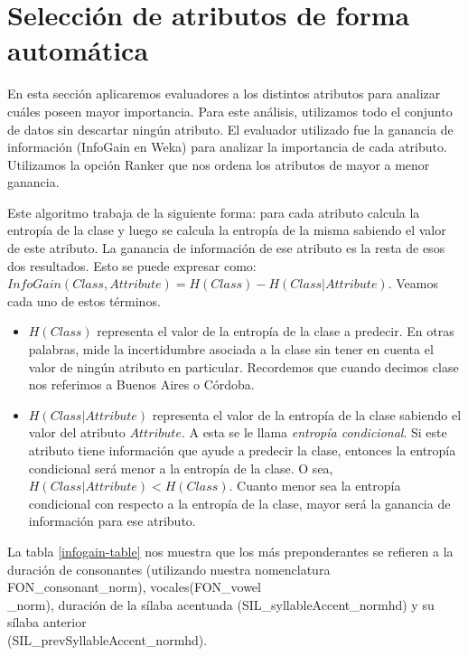 
\section{Selección de atributos de forma automática}



En esta sección aplicaremos evaluadores a los distintos atributos para analizar cuáles poseen mayor importancia. Para este análisis, utilizamos todo el conjunto de datos sin descartar ningún atributo. El evaluador utilizado fue la ganancia de información (InfoGain en Weka) para analizar la importancia de cada atributo. Utilizamos la opción Ranker que nos ordena los atributos de mayor a menor ganancia.

Este algoritmo trabaja de la siguiente forma: para cada atributo calcula la entropía de la clase y luego se calcula la entropía de la misma sabiendo el valor de este atributo. La ganancia de información de ese atributo es la resta de esos dos resultados. Esto se puede expresar como: $InfoGain(Class,Attribute) = H(Class) - H(Class | Attribute)$. Veamos cada uno de estos términos.

\begin{itemize}
	\item $H(Class)$ representa el valor de la entropía de la clase a predecir. En otras palabras, mide la incertidumbre asociada a la clase sin tener en cuenta el valor de ningún atributo en particular. Recordemos que cuando decimos clase nos referimos a Buenos Aires o Córdoba.
	
	\item  $H(Class | Attribute)$ representa el valor de la entropía de la clase sabiendo el valor del atributo $Attribute$. A esta se le llama \textit{entropía condicional}. Si este atributo tiene información que ayude a predecir la clase, entonces la entropía condicional será menor a la entropía de la clase. O sea, $H(Class | Attribute) < H(Class)$. Cuanto menor sea la entropía condicional con respecto a la entropía de la clase, mayor será la ganancia de información para ese atributo.
\end{itemize}

La tabla \ref{infogain-table} nos muestra que los más preponderantes se refieren a la duración de consonantes (utilizando nuestra nomenclatura FON\_consonant\_norm), vocales(FON\_vowel\\ \_norm), duración de la sílaba acentuada (SIL\_syllableAccent\_\-normhd) y su sílaba anterior \\ (SIL\_prevSyllableAccent\_normhd). 	 

